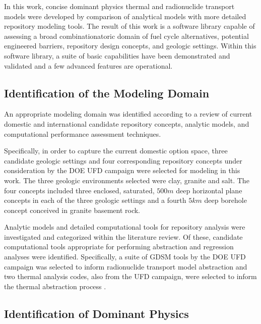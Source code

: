
In this work, concise dominant physics thermal and radionuclide transport models 
were developed by comparison of analytical models with more detailed repository 
modeling tools. The result of this work is a software library capable 
of assessing a broad combinationatoric domain of fuel cycle alternatives, potential 
engineered barriers, repository design concepts, and geologic settings. Within 
this software library, a suite of basic capabilities have been demonstrated and 
validated and a few advanced features are operational. 

\subsection{Identification of the Modeling Domain}

An appropriate modeling domain was identified according to a review of current 
domestic and international candidate repository concepts, analytic models, and 
computational performance assessment techniques.  

Specifically, in order to capture the current domestic option space, three 
candidate geologic settings and four corresponding repository concepts under 
consideration by the \gls{DOE} \gls{UFD} campaign were selected for modeling in 
this work. The three geologic environments selected were clay, granite and salt.  
The four concepts included three enclosed, saturated, $500m$ deep horizontal 
plane concepts in each of the three geologic settings and a fourth $5km$ deep 
borehole concept conceived in granite basement rock.


Analytic models and detailed computational tools for repository analysis were 
investigated and categorized within the literature review.  Of these, candidate 
computational tools appropriate for performing abstraction and regression 
analyses were identified. Specifically, a suite of \gls{GDSM} tools by the 
\gls{DOE} \gls{UFD} campaign was selected to inform radionuclide transport model 
abstraction\cite{clayton_generic_2011} and two thermal analysis codes, also from the \gls{UFD} 
campaign, were selected to inform the thermal abstraction process 
\cite{huff_benchmarking_2012, huff_numerical_2012, greenberg_application_2012}.


\subsection{Identification of Dominant Physics}

